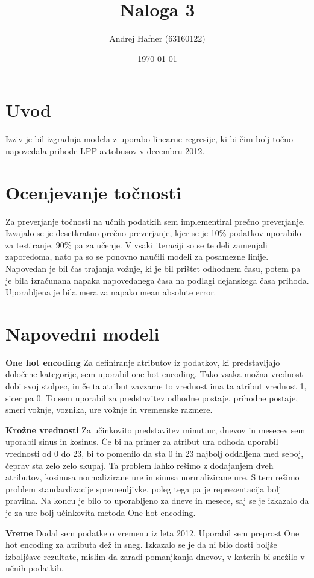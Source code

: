 \documentclass[a4paper,11pt]{article}
\title{Naloga 3}
\author{Andrej Hafner (63160122)}
\date{\today}
\begin{document}
\maketitle



\section{Uvod}
Izziv je bil izgradnja modela z uporabo linearne regresije, ki bi čim bolj točno napovedala prihode LPP avtobusov v decembru 2012.


\normalfont
\section{Ocenjevanje točnosti}
Za preverjanje točnosti na učnih podatkih sem implementiral prečno preverjanje. Izvajalo se je desetkratno prečno preverjanje, kjer se je 10\% podatkov uporabilo za testiranje, 90\% pa za učenje. V vsaki iteraciji so se te deli zamenjali zaporedoma, nato pa so se ponovno naučili modeli za posamezne linije. Napovedan je bil čas trajanja vožnje, ki je bil prištet odhodnem času, potem pa je bila izračunana napaka napovedanega časa na podlagi dejanskega časa prihoda. Uporabljena je bila mera za napako mean absolute error.

\section{Napovedni modeli}
\begin{list}{label}{}
	\item[\textbf{One hot encoding}] Za definiranje atributov iz podatkov, ki predstavljajo določene kategorije, sem uporabil one hot encoding. Tako vsaka možna vrednost dobi svoj stolpec, in če ta atribut zavzame to vrednost ima ta atribut vrednost 1, sicer pa 0. To sem uporabil za predstavitev odhodne postaje, prihodne postaje, smeri vožnje, voznika, ure vožnje in vremenske razmere. 
	\item[\textbf{Krožne vrednosti}] Za učinkovito predstavitev minut,ur, dnevov in mesecev sem uporabil sinus in kosinus. Če bi na primer za atribut ura odhoda uporabil vrednosti od 0 do 23, bi to pomenilo da sta 0 in 23 najbolj oddaljena med seboj, čeprav sta zelo zelo skupaj. Ta problem lahko rešimo z dodajanjem dveh atributov, kosinusa normalizirane ure in sinusa normalizirane ure. S tem rešimo problem standardizacije spremenljivke, poleg tega pa je reprezentacija bolj pravilna. Na koncu je bilo to uporabljeno za dneve in mesece, saj se je izkazalo da je za ure bolj učinkovita metoda One hot encoding.
	\item[\textbf{Vreme}] Dodal sem podatke o vremenu iz leta 2012.  Uporabil sem preprost One hot encoding za atributa dež in sneg. Izkazalo se je da ni bilo dosti boljše izboljšave rezultate, mislim da zaradi pomanjkanja dnevov, v katerih bi snežilo v učnih podatkih. 
\end{list}
\end{document}
